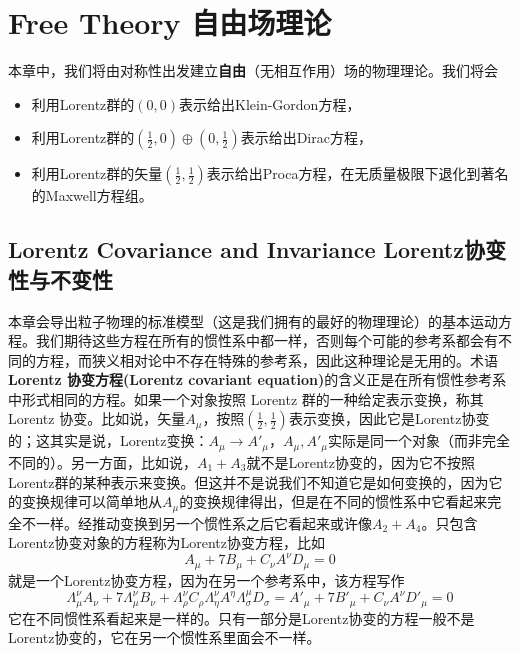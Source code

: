 


\chapter[自由场理论]{Free Theory \quad 自由场理论}\label{chap6}

本章中，我们将由对称性出发建立{\bfseries 自由}（无相互作用）场的物理理论。我们将会
\begin{itemize}
\item 利用Lorentz群的$(0,0)$表示给出Klein-Gordon方程，
\item 利用Lorentz群的$(\tfrac{1}{2},0)\oplus(0,\tfrac{1}{2})$表示给出Dirac方程，
\item 利用Lorentz群的矢量$(\tfrac{1}{2},\tfrac{1}{2})$表示给出Proca方程，在无质量极限下退化到著名的Maxwell方程组。
\end{itemize}

\section[Lorentz协变性与不变性]{Lorentz Covariance and Invariance \quad Lorentz协变性与不变性}\label{sec6.1}

本章会导出粒子物理的标准模型（这是我们拥有的最好的物理理论）的基本运动方程。我们期待这些方程在所有的惯性系中都一样，否则每个可能的参考系都会有不同的方程，而狭义相对论中不存在特殊的参考系，因此这种理论是无用的。术语{\bfseries Lorentz 协变方程(Lorentz covariant equation)}的含义正是在所有惯性参考系中形式相同的方程。如果一个对象按照 Lorentz 群的一种给定表示变换，称其 Lorentz 协变。比如说，矢量$A_\mu$，按照$\left(\frac{1}{2},\frac{1}{2}\right)$表示变换，因此它是Lorentz协变的；这其实是说，Lorentz变换：$A_\mu \to A'_\mu$，$A_\mu, A'_{\mu}$实际是同一个对象（而非完全不同的）。另一方面，比如说，$A_1+A_3$就不是Lorentz协变的，因为它不按照Lorentz群的某种表示来变换。但这并不是说我们不知道它是如何变换的，因为它的变换规律可以简单地从$A_\mu$的变换规律得出，但是在不同的惯性系中它看起来完全不一样。经推动变换到另一个惯性系之后它看起来或许像$A_2+A_4$。只包含Lorentz协变对象的方程称为Lorentz协变方程，比如
\[A_\mu+7B_\mu+C_\nu A^\nu D_\mu = 0 \]
就是一个Lorentz协变方程，因为在另一个参考系中，该方程写作
\[\Lambda_\mu^\nu A_\nu + 7 \Lambda_\mu^\nu B_\nu + \Lambda_\rho^\nu C_\rho \Lambda_\eta^\nu A^\eta \Lambda_\sigma^\mu D_\sigma = A'_\mu+7B'_\mu+C_\nu A^\nu D'_\mu = 0 \]
它在不同惯性系看起来是一样的。只有一部分是Lorentz协变的方程一般不是Lorentz协变的，它在另一个惯性系里面会不一样。

